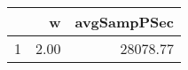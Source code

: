 \begin{table}[h]
\centering
\begin{tabular}{rrr}
  \hline
 & w & avgSampPSec \\ 
  \hline
1 & 2.00 & 28078.77 \\ 
   \hline
\end{tabular}
\end{table}
